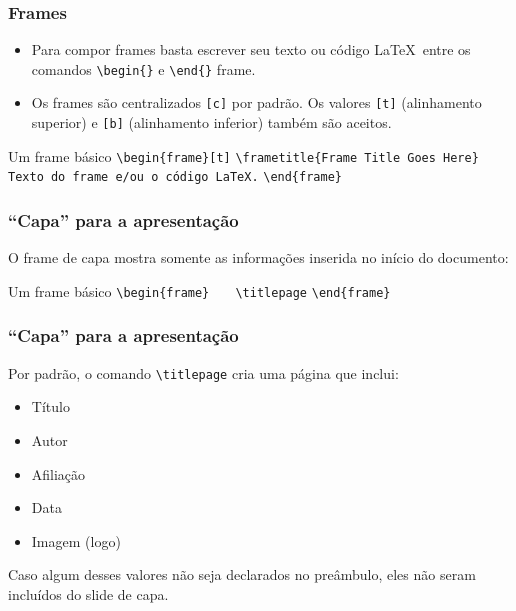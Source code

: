 \begin{frame}[fragile]
\frametitle{Frames}
\scriptsize
\begin{itemize}
  \item Para compor frames basta escrever seu texto ou código \LaTeX\ entre os
comandos \verb|\begin{}| e \verb|\end{}| frame.
  \item Os frames são centralizados \verb|[c]| por padrão. Os valores \verb|[t]| (alinhamento
superior) e \verb|[b]|  (alinhamento inferior) também são aceitos.
\end{itemize}

\begin{block}{Um frame básico}
	\verb|\begin{frame}[t]|\newline
  	\verb|\frametitle{Frame Title Goes Here}|\newline
	\verb|	Texto do frame e/ou o código LaTeX.|\newline
	\verb|\end{frame}|
\end{block}
\end{frame}

\begin{frame}[fragile]
\frametitle{``Capa'' para a apresentação }
O frame de capa mostra somente as informações inserida no início do documento:

\begin{block}{Um frame básico}
	\verb|\begin{frame}|\newline
  	\verb|   \titlepage|\newline
	\verb|\end{frame}|
\end{block}

\end{frame}


\begin{frame}[fragile]
\frametitle{``Capa'' para a apresentação }
Por padrão, o comando \verb|\titlepage| cria uma página que inclui:
\begin{itemize}
  \item Título
  \item Autor
  \item Afiliação
  \item Data
  \item Imagem (logo)
\end{itemize}

Caso algum desses valores não seja declarados no preâmbulo, eles não seram incluídos do slide de
capa.
\end{frame}


